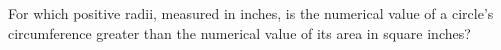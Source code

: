 For which positive radii, measured in inches, is the numerical value of a circle's circumference greater than the numerical value of its area in square inches?
